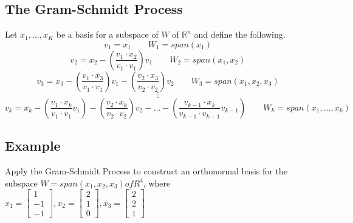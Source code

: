 \subsection{The Gram-Schmidt Process}
Let ${x_1,\dots, x_K}$ be a basis for a subspace of $W$ of $\mathbb{R}^n$ and define the following.
$$v_1 = x_1\qquad W_1 = span(x_1)$$
$$v_2 = x_2 - (\frac{v_1\cdot x_2}{v_1\cdot v_1})v_1\qquad W_2 = span(x_1, x_2)$$
$$v_3 = x_3 - (\frac{v_1\cdot x_3}{v_1\cdot v_1})v_1 - (\frac{v_2\cdot x_3}{v_2\cdot v_2})v_2\qquad W_3 = span(x_1, x_2, x_3)$$
$$\vdots$$
$$v_k = x_k - (\frac{v_1\cdot x_k}{v_1\cdot v_1}v_1) - (\frac{v_2\cdot x_k}{v_2\cdot v_2})v_2 - \dots - (\frac{v_{k-1}\cdot x_k}{v_{k-1}\cdot v_{k-1}}v_{k-1})\qquad W_k = span(x_1, \dots, x_k)$$

\subsection*{Example}
Apply the Gram-Schmidt Process to construct an orthonormal basis for the subspace $W = span(x_1, x_2, x_3) of R^4$, where $x_1 = \begin{bmatrix}
    1\\-1\\-1
\end{bmatrix}, x_2 = \begin{bmatrix}
    2\\1\\0
\end{bmatrix}, x_3 = \begin{bmatrix}
    2\\2\\1
\end{bmatrix}$
